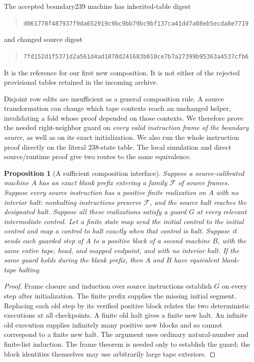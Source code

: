 \documentclass[11pt,letterpaper]{article}
\newtheorem{proposition}[theorem]{Proposition}
\theoremstyle{definition}\newtheorem{definition}[theorem]{Definition}
\newcommand{\hash}[1]{\begin{quote}\footnotesize\expandafter\nolinkurl\expandafter{#1}\end{quote}}
\begin{document}
The accepted boundary239 machine has inherited-table digest
\hash{d061770f487937f9da652919c9bc9bb79bc9bf137ca41dd7a08eb5ecda8e7719}
and changed source digest
\hash{7fd152d1f5371d2a561d4ad1870d241683b010ce7b7a27399b95363a4537cfb6}
It is the reference for our first new composition.  It is not either of
the rejected provisional tables retained in the incoming archive.

Disjoint row edits are insufficient as a general composition rule.
A source transformation can change which tape contexts reach an unchanged
helper, invalidating a fold whose proof depended on those contexts.  We
therefore prove the needed right-neighbor guard on \emph{every valid
instruction frame of the boundary source}, as well as on its exact
initialization.  We also run the whole instruction proof directly on the
literal 238-state table.  The local simulation and direct source/runtime
proof give two routes to the same equivalence.

\begin{proposition}[A sufficient composition interface]\label{prop:interface}
Suppose a source-calibrated machine $A$ has an exact blank prefix entering
a family $\mathcal F$ of source frames.  Suppose every source instruction
has a positive finite realization on $A$ with no interior halt:
nonhalting instructions preserve $\mathcal F$, and the source halt reaches
the designated halt.  Suppose all these realizations satisfy a guard $G$
at every relevant intermediate control.  Let a finite state map send the
initial control to the initial control and map a control to halt exactly
when that control is halt.  Suppose it sends each guarded step of $A$ to
a positive block of a second machine $B$, with the same
entire tape, head, and mapped endpoint, and with no interior halt.
If the same guard holds during the blank prefix, then $A$ and $B$ have
equivalent blank-tape halting.
\end{proposition}

\begin{proof}
Frame closure and induction over source instructions establish $G$ on
every step after initialization.  The finite prefix supplies the missing
initial segment.  Replacing each old step by its verified positive block
relates the two deterministic executions at all checkpoints.  A finite
old halt gives a finite new halt.  An infinite old execution supplies
infinitely many positive new blocks and so cannot correspond to a finite
new halt.  The argument uses ordinary natural-number and finite-list
induction.  The frame theorem is needed only to establish the guard;
the block identities themselves may use arbitrarily large tape exteriors.
\end{proof}
\end{document}
